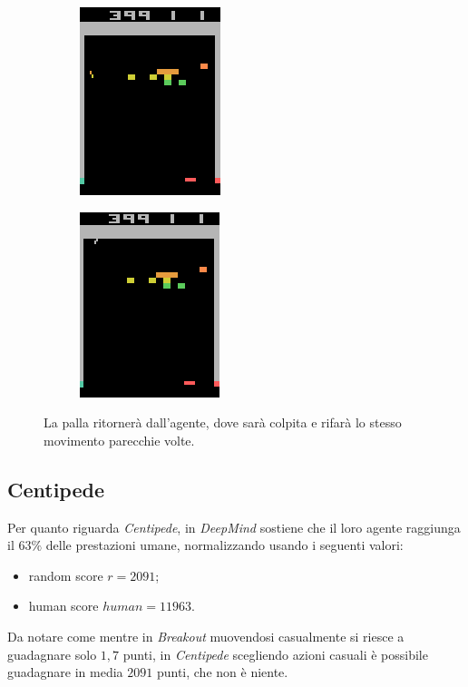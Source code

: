 \documentclass[twoside,twocolumn,10pt]{extarticle}
\theoremstyle{definition}
\begin{document}
			\begin{figure}[ht!]
				\centering
				\begin{subfigure}[b]{.3\textwidth}
					\centering
					\includegraphics[scale=1]{images/cycle1.png}
					\label{fig:cycle1}
				\end{subfigure}
			
				\begin{subfigure}[b]{.3\textwidth}
					\centering
					\includegraphics[scale=1]{images/cycle2.png}
					\label{fig:cycle2}
				\end{subfigure}
				\caption{La palla ritornerà dall'agente, dove sarà colpita e rifarà lo stesso movimento parecchie volte.}
				\label{fig:cycle}
			\end{figure}
		
	\subsection{Centipede}
		Per quanto riguarda \textit{Centipede}, in \cite{bib:dqn} \textit{DeepMind} sostiene che il loro agente raggiunga il $63\%$ delle prestazioni umane, normalizzando usando i seguenti valori:
		\begin{itemize}
			\item random score $r = 2091$;
			\item human score $human = 11963$.
		\end{itemize}
		Da notare come mentre in \textit{Breakout} muovendosi casualmente si riesce a guadagnare solo $1,7$ punti, in \textit{Centipede} scegliendo azioni casuali è possibile guadagnare in media $2091$ punti, che non è niente.	
		
\end{document}

